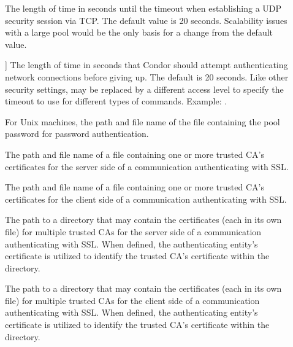 \begin{description}
\item[]
\label{param:SecTCPSessionTimeout}
The length of time in seconds until the timeout
when establishing a UDP security session via TCP.
The default value is 20 seconds.
Scalability issues with a large pool would be the only basis
for a change from the default value.

\item[]
\label{param:SecDaemonAuthenticationTimeout}]
The length of time in seconds that Condor should attempt
authenticating network connections before giving up.  The default is
20 seconds.  Like other security settings,  may be
replaced by a different access level to specify the timeout to use for
different types of commands.  Example:
.

\item[]
\label{param:SecPasswordFile} For Unix machines, the path and file name
of  the file containing the pool password for password authentication.


\item[]
\label{param:AuthSSLServerCAFile}  The path and file name of
a file containing one or more trusted CA's certificates
for the server side of a communication authenticating 
with SSL.

\item[]
\label{param:AuthSSLClientCAFile} The path and file name of
a file containing one or more trusted CA's certificates
for the client side of a communication authenticating 
with SSL.


\item[]
\label{param:AuthSSLServerCADir}  
The path to a directory that may contain the 
certificates (each in its own file) for multiple trusted CAs 
for the server side of a communication authenticating 
with SSL.
When defined, the authenticating entity's certificate 
is utilized to identify the trusted CA's certificate
within the directory.

\item[]
\label{param:AuthSSLClientCADir} 
The path to a directory that may contain the 
certificates (each in its own file) for multiple trusted CAs 
for the client side of a communication authenticating 
with SSL.
When defined, the authenticating entity's certificate 
is utilized to identify the trusted CA's certificate
within the directory.



\end{description}

